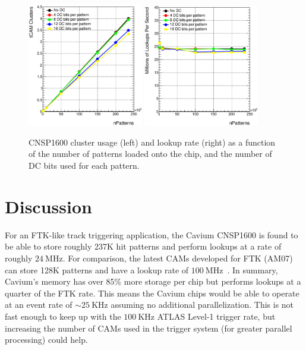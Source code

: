 \documentclass[preprint,prd,showpacs]{revtex4-1}
\newcommand{\mhz}{~\mathrm{MHz}}
\newcommand{\khz}{~\mathrm{KHz}}
\begin{document}
\begin{figure}[!htb]
\begin{center}
\includegraphics[width=0.45\textwidth]{figures/PlotTcamData_eps/001}
\includegraphics[width=0.45\textwidth]{figures/PlotTcamData_eps/002}
\caption{CNSP1600 cluster usage (left) and lookup rate (right) as a function of the number of patterns loaded onto the chip, and the number of DC bits used for each pattern.}
\label{fig:nsp_perf_plots}
\end{center}
\end{figure}


\section{Discussion}\label{sec:Discussion}

For an FTK-like track triggering application, the Cavium CNSP1600 is found to be able to store roughly 237K hit patterns and perform lookups at a rate of roughly $24\mhz$. For comparison, the latest CAMs developed for FTK (AM07) can store 128K patterns and have a lookup rate of $100\mhz$~\cite{FIXME}. In summary, Cavium's memory has over 85\% more storage per chip but performs lookups at a quarter of the FTK rate. This means the Cavium chips would be able to operate at an event rate of $\sim25\khz$ assuming no additional parallelization. This is not fast enough to keep up with the $100\khz$ ATLAS Level-1 trigger rate, but increasing the number of CAMs used in the trigger system (for greater parallel processing) could help. 
\end{document}
